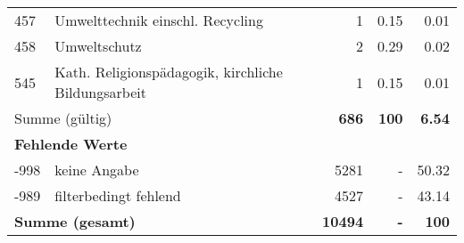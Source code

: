 \begin{longtable}{lXrrr}
        457 & \multicolumn{1}{X}{Umwelttechnik einschl. Recycling} & %
          \num{1} &
          \num[round-mode=places,round-precision=2]{0.15} &
          \num[round-mode=places,round-precision=2]{0.01} \\

        458 & \multicolumn{1}{X}{Umweltschutz} & %
          \num{2} &
          \num[round-mode=places,round-precision=2]{0.29} &
          \num[round-mode=places,round-precision=2]{0.02} \\

        545 & \multicolumn{1}{X}{Kath. Religionspädagogik, kirchliche Bildungsarbeit} & %
          \num{1} &
          \num[round-mode=places,round-precision=2]{0.15} &
          \num[round-mode=places,round-precision=2]{0.01} \\

     \midrule
     \multicolumn{2}{l}{Summe (gültig)} &
       \textbf{\num{686}} &
     \textbf{\num{100}} &
       \textbf{\num[round-mode=places,round-precision=2]{6.54}} \\
     \multicolumn{5}{l}{\textbf{Fehlende Werte}}\\
       -998 &
       keine Angabe &
         \num{5281} &
        - &
         \num[round-mode=places,round-precision=2]{50.32} \\
       -989 &
       filterbedingt fehlend &
         \num{4527} &
        - &
         \num[round-mode=places,round-precision=2]{43.14} \\
     \midrule
     \multicolumn{2}{l}{\textbf{Summe (gesamt)}} &
          \textbf{\num{10494}} &
        \textbf{-} &
        \textbf{\num{100}} \\
     \bottomrule
     \end{longtable}
     
